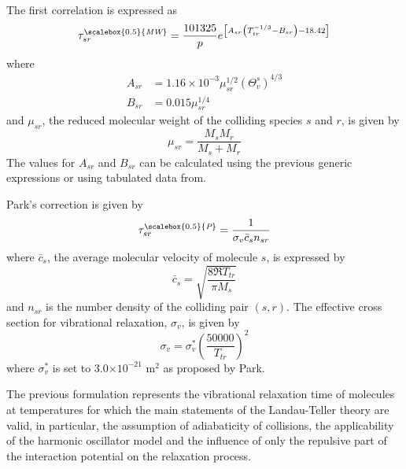 \documentclass[10pt]{beamer}
\begin{document}
\begin{frame}
The first correlation is expressed as
\begin{equation} \label{eq:tau_MW}
\tau_{sr}^{\scalebox{0.5}{\textit{MW}}}=\frac{101325}{p}
e^{\left[A_{sr}\left(T_{tr}^{-1/3}-B_{sr}\right)-18.42\right]}
\end{equation}
where
\begin{equation} \label{eq:MWcoeff}
\begin{split}
A_{sr}&=1.16\times 10^{-3}\mu_{sr}^{1/2}\left(\Theta_v^s\right)^{4/3}
\\ B_{sr}&=0.015\mu_{sr}^{1/4}
\end{split}
\end{equation}
and $\mu_{sr}$, the reduced molecular weight of the colliding species $s$ and
$r$, is given by
\begin{equation} \label{eq:reducedM}
\mu_{sr}=\frac{M_sM_r}{M_s+M_r}
\end{equation}
The values for $A_{sr}$ and $B_{sr}$ can be calculated using the previous
generic expressions or using tabulated data from.
\end{frame}

\begin{frame}
Park's correction is given by
\begin{equation} \label{eq:tau_P}
\tau_{sr}^{\scalebox{0.5}{\textit{P}}}=\frac{1}{\sigma_v\bar{c}_sn_{sr}}
\end{equation}
where $\bar{c}_s$, the average molecular velocity of molecule $s$, is
expressed by
\begin{equation} \label{eq:molVel}
\bar{c}_s=\sqrt{\frac{8\Re T_{tr}}{\pi M_s}}
\end{equation}
and $n_{sr}$ is the number density of the colliding pair $\left(s,r\right)$.
The effective cross section for vibrational relaxation, $\sigma_v$, is given
by
\begin{equation} \label{eq:effCrossSection}
\sigma_v=\sigma_v^*\left(\frac{50000}{T_{tr}}\right)^2
\end{equation}
where $\sigma_v^*$ is set to 3.0$\times10^{-21}$ m$^2$ as proposed by Park.
\end{frame}

\begin{frame}
The previous formulation represents the vibrational relaxation time of molecules
at temperatures for which the main statements of the Landau-Teller theory are
valid, in particular, the assumption of adiabaticity of collisions, the
applicability of the harmonic oscillator model and the influence of only the
repulsive part of the interaction potential on the relaxation process.
\end{frame}
\end{document}
